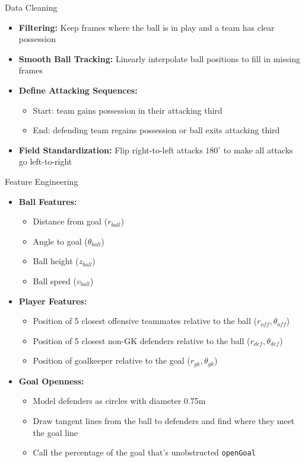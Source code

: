\documentclass{beamer}
\begin{document}
\begin{frame}{Data Cleaning}
\begin{itemize}
\item \textbf{Filtering:} Keep frames where the ball is in play and a team has clear possession
\item \textbf{Smooth Ball Tracking:} Linearly interpolate ball positions to fill in missing frames
\item \textbf{Define Attacking Sequences:}
  \begin{itemize}
  \item Start: team gains possession in their attacking third
  \item End: defending team regains possession or ball exits attacking third
  \end{itemize}
\item \textbf{Field Standardization:} Flip right-to-left attacks $180^{\circ}$ to make all attacks go left-to-right
\end{itemize}
\end{frame}

\begin{frame}{Feature Engineering}
\begin{itemize}
\item \textbf{Ball Features:}
  \begin{itemize}
  \item Distance from goal ($r_{ball}$)
  \item Angle to goal ($\theta_{ball}$)
  \item Ball height ($z_{ball}$)
  \item Ball speed ($v_{ball}$)
  \end{itemize}
\item \textbf{Player Features:}
  \begin{itemize}
  \item Position of 5 closest offensive teammates relative to the ball ($r_{off}, \theta_{off}$)
  \item Position of 5 closest non-GK defenders relative to the ball ($r_{def}, \theta_{def}$)
  \item Position of goalkeeper relative to the goal ($r_{gk}, \theta_{gk}$)
  \end{itemize}
\item \textbf{Goal Openness:}
  \begin{itemize}
    \item Model defenders as circles with diameter 0.75m
    \item Draw tangent lines from the ball to defenders and find where they meet the goal line
    \item Call the percentage of the goal that's unobstructed \texttt{openGoal}
  \end{itemize}
\end{itemize}
\end{frame}
\end{document}
